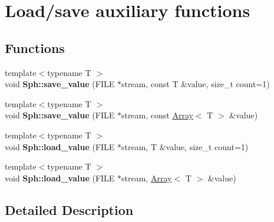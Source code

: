 \hypertarget{group__loadsave__grp}{}\section{Load/save auxiliary functions}
\label{group__loadsave__grp}
\subsection*{Functions}
\begin{DoxyCompactItemize}
\item 
\hypertarget{group__loadsave__grp_ga90a55a2f662361fb9bb7fdc720871324}{}\label{group__loadsave__grp_ga90a55a2f662361fb9bb7fdc720871324} 
{\footnotesize template$<$typename T $>$ }\\void {\bfseries Sph\+::save\+\_\+value} (F\+I\+LE $\ast$stream, const T \&value, size\+\_\+t count=1)
\item 
\hypertarget{group__loadsave__grp_ga2fc3df34479aed267552bc845003be49}{}\label{group__loadsave__grp_ga2fc3df34479aed267552bc845003be49} 
{\footnotesize template$<$typename T $>$ }\\void {\bfseries Sph\+::save\+\_\+value} (F\+I\+LE $\ast$stream, const \hyperlink{classArray}{Array}$<$ T $>$ \&value)
\item 
\hypertarget{group__loadsave__grp_ga506ca848287e684203de17ad7bd3f04e}{}\label{group__loadsave__grp_ga506ca848287e684203de17ad7bd3f04e} 
{\footnotesize template$<$typename T $>$ }\\void {\bfseries Sph\+::load\+\_\+value} (F\+I\+LE $\ast$stream, T \&value, size\+\_\+t count=1)
\item 
\hypertarget{group__loadsave__grp_gac49c2d5c611ef5cab9bc8236571ca598}{}\label{group__loadsave__grp_gac49c2d5c611ef5cab9bc8236571ca598} 
{\footnotesize template$<$typename T $>$ }\\void {\bfseries Sph\+::load\+\_\+value} (F\+I\+LE $\ast$stream, \hyperlink{classArray}{Array}$<$ T $>$ \&value)
\end{DoxyCompactItemize}


\subsection{Detailed Description}
